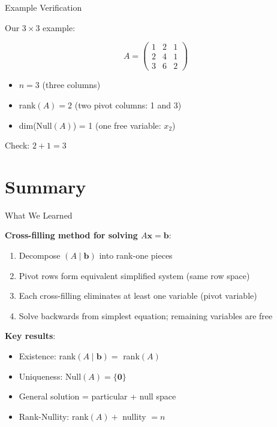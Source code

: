 \documentclass[10pt]{beamer}
\theoremstyle{definition}
\newcommand{\x}[1]{\alert{\textbf{#1}}}
\begin{document}
\begin{frame}{Example Verification}

Our $3 \times 3$ example:

$$A = \begin{pmatrix} 1&2&1 \\ 2&4&1 \\ 3&6&2 \end{pmatrix}$$

\vspace{1em}

\begin{itemize}
\item $n = 3$ (three columns)
\item rank$(A) = 2$ (two pivot columns: 1 and 3)
\item dim(Null$(A)$) = 1 (one free variable: $x_2$)
\end{itemize}

\vspace{1em}

Check: $2 + 1 = 3$ \checkmark

\end{frame}

\section{Summary}

\begin{frame}{What We Learned}

\x{Cross-filling method for solving $A\mathbf{x} = \mathbf{b}$}:
\begin{enumerate}
\item Decompose $(A \mid \mathbf{b})$ into rank-one pieces
\item Pivot rows form equivalent simplified system (same row space)
\item Each cross-filling eliminates at least one variable (pivot variable)
\item Solve backwards from simplest equation; remaining variables are free
\end{enumerate}

\vspace{1em}

\x{Key results}:
\begin{itemize}
\item Existence: rank$(A \mid \mathbf{b}) = $ rank$(A)$
\item Uniqueness: Null$(A) = \{\mathbf{0}\}$
\item General solution = particular + null space
\item Rank-Nullity: rank$(A) + $ nullity $ = n$
\end{itemize}

\end{frame}
\end{document}
